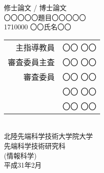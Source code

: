 \pagestyle{empty}
\begin{center}
修士論文 / 博士論文  \\
\vspace{80pt}
〇〇〇〇〇題目〇〇〇〇〇\\
\vspace{80pt}
1710000 %
\quad
〇〇氏名〇〇\\
\vspace{100pt}
\begin{tabular}{rl}
主指導教員 & 〇〇 〇〇\\
審査委員主査 & 〇〇 〇〇\\
審査委員 & 〇〇 〇〇\\
& 〇〇 〇〇\\
& 〇〇 〇〇
\end{tabular}\\
\vspace{90pt}
北陸先端科学技術大学院大学\\
先端科学技術研究科\\ %
(情報科学)\\ %
\vspace{90pt}
平成31年2月\\ %
\end{center}
\cleardoublepage